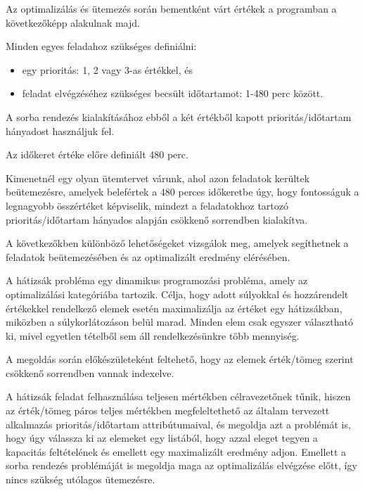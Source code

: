 Az optimalizálás és ütemezés során bementként várt értékek a programban a következőképp alakulnak majd.

Minden egyes feladahoz szükséges definiálni:

\begin{itemize}
	
\item egy prioritás: 1, 2 vagy 3-as értékkel, és
\item feladat elvégzéséhez szükséges becsült időtartamot: 1-480 perc között.

\end{itemize}

A sorba rendezés kialakításához ebből a két értékből kapott prioritás/időtartam hányadost használjuk fel.

Az időkeret értéke előre definiált 480 perc.

Kimenetnél egy olyan ütemtervet várunk, ahol azon feladatok kerültek beütemezésre, amelyek belefértek a 480 perces időkeretbe úgy, hogy fontosságuk a legnagyobb összértéket képviselik, mindezt a feladatokhoz tartozó prioritás/időtartam hányados alapján csökkenő sorrendben kialakítva.

A következőkben különböző lehetőségeket vizsgálok meg, amelyek segíthetnek a feladatok beütemezésében és az optimalizált eredmény elérésében.



A hátizsák probléma egy dinamikus programozási probléma, amely az optimalizálási kategóriába tartozik. Célja, hogy adott súlyokkal és hozzárendelt értékekkel rendelkező elemek esetén maximalizálja az értéket egy hátizsákban, miközben a súlykorlátozáson belül marad. Minden elem csak egyszer választható ki, mivel egyetlen tételből sem áll rendelkezésünkre több mennyiség.

A megoldás során előkészületeként feltehető, hogy az elemek érték/tömeg szerint csökkenő sorrendben vannak indexelve.

A hátizsák feladat felhasználása teljesen mértékben célravezetőnek tűnik, hiszen az érték/tömeg páros teljes mértékben megfeleltethető az általam tervezett alkalmazás prioritás/időtartam attribútumaival, és megoldja azt a problémát is, hogy úgy válassza ki az elemeket egy listából, hogy azzal eleget tegyen a kapacitás feltételének és emellett egy maximalizált eredmény adjon. Emellett a sorba rendezés problémáját is megoldja maga az optimalizálás elvégzése előtt, így nincs szükség utólagos ütemezésre.


